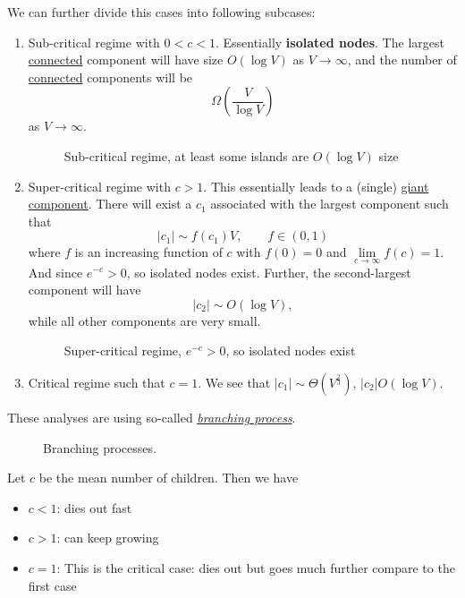 \begin{remark}
	We can further divide this cases into following subcases:
	\begin{enumerate}
		\item Sub-critical regime with \(0<c<1\). Essentially \textbf{isolated nodes}. The largest \hyperref[def:connected]{connected} component will have size \(O(\log V)\) as \(V\to \infty \), and the number of \hyperref[def:connected]{connected} components will be
		      \[
			      \Omega\left(\frac{V}{\log V}\right)
		      \]
		      as \(V\to \infty \).
		      \begin{figure}[H]
			      \centering
			      \caption{Sub-critical regime, at least some islands are \(O(\log V)\) size}
			      \label{fig:sub-critical-regime}
		      \end{figure}
		\item Super-critical regime with \(c>1\). This essentially leads to a (single) \hyperref[def:giant-component]{giant component}. There will exist a \(c_1\) associated with the largest component such that
		      \[
			      \left\vert c_1 \right\vert \sim f(c_1)V, \qquad f\in(0, 1)
		      \]
		      where \(f\) is an increasing function of \(c\) with \(f(0) = 0\) and \(\lim\limits_{c\to \infty }f(c) = 1\). And since \(e^{-c}>0\), so isolated nodes exist. Further, the second-largest component will have
		      \[
			      \left\vert c_2 \right\vert \sim O(\log V),
		      \]
		      while all other components are very small.
		      \begin{figure}[H]
			      \centering
			      \caption{Super-critical regime, \(e^{-c}>0\), so isolated nodes exist}
			      \label{fig:super-critical-regime}
		      \end{figure}
		\item Critical regime such that \(c = 1\). We see that \(\left\vert c_1 \right\vert \sim \Theta(V^{\frac{2}{3}})\), \(\left\vert c_2 \right\vert O(\log V)\).
	\end{enumerate}
	\begin{remark}
		These analyses are using so-called \href{https://en.wikipedia.org/wiki/Branching_process}{\emph{branching process}}.
		\begin{figure}[H]
			\centering
			\caption{Branching processes.}
			\label{fig:branching-processes}
		\end{figure}

		Let \(c\) be the mean number of children. Then we have
		\begin{itemize}
			\item \(c<1\): dies out fast
			\item \(c>1\): can keep growing
			\item \(c=1\): This is the critical case: dies out but goes much further compare to the first case
		\end{itemize}
	\end{remark}
\end{remark}

